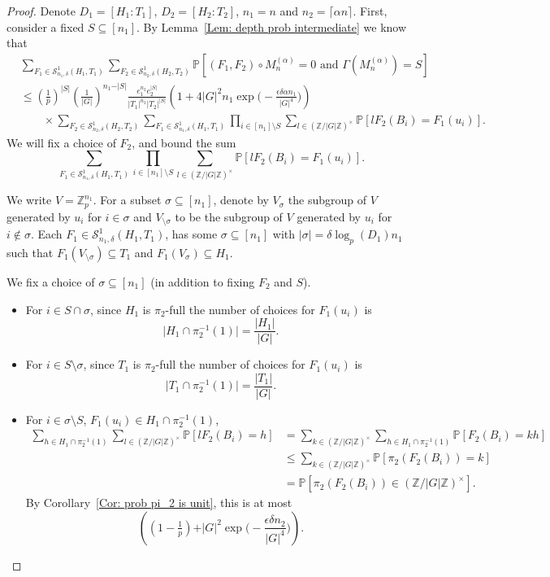 \documentclass[10pt,a4paper]{amsart}
\newcommand{\Mna}{M_{n}^{(\alpha)}}
\newcommand{\PPP}{\mathbb{P}}
\newcommand{\SSO}[3]{\mathcal{S}^1_{#1}(#2,#3)}
\newcommand{\Z}{\mathbb{Z}}
\newcommand{\ZG}{\Z/\abs{G}\Z}
\newcommand{\Zp}{\Z_p}
\newcommand{\abs}[1]{\vert#1\vert}
\newcommand{\ceil}[1]{\lceil#1\rceil}
\begin{document}
\begin{proof}
Denote $D_1=[H_1:T_1]$, $D_2=[H_2:T_2]$, $n_1=n$ and $n_2=\ceil{\alpha n}$.
First, consider a fixed $S\subseteq[n_1]$. 
By Lemma~\ref{Lem: depth prob intermediate} we know that
\begin{align*}
&\sum_{F_1\in \SSO{n_1,\delta}{H_1}{T_1}}
\sum_{F_2\in \SSO{n_2,\delta}{H_2}{T_2}}
\PPP[(F_1,F_2)\circ \Mna=0 \text{ and } \Gamma(\Mna)=S]\\
&\leq (\tfrac{1}{p})^{\abs{S}} (\tfrac{1}{\abs{G}})^{n_1-\abs{S}}
\frac{e_1^{n_2} e_2^{\abs{S}}}{\abs{T_1}^{n_2} \abs{T_2}^{\abs{S}}}
\left(1+4\abs{G}^2n_1 \exp\Big(-\frac{\epsilon \delta \alpha n_1}{|G|^4}\Big) \right)\\
&\quad\quad\times 
\sum_{F_2\in \SSO{n_2,\delta}{H_2}{T_2}}
\sum_{F_1\in \SSO{n_1,\delta}{H_1}{T_1}}
\prod_{i\in [n_1]\setminus S} \sum_{l\in (\Z/\abs{G}\Z)^{\times}} \PPP[l F_2(B_i)= F_1(u_i)].
\end{align*}
We will fix a choice of $F_2$, and bound the sum
\[
\sum_{F_1\in \SSO{n_1,\delta}{H_1}{T_1}}
\prod_{i\in [n_1]\setminus S} \sum_{l\in (\Z/\abs{G}\Z)^{\times}} \PPP[l F_2(B_i)= F_1(u_i)].
\]

We write $V=\Zp^{n_1}$.
For a subset $\sigma\subseteq[n_1]$, denote by $V_{\sigma}$ the subgroup of $V$ generated by $u_i$ for $i\in \sigma$ and $V_{\setminus \sigma}$ to be the subgroup of $V$ generated by $u_i$ for $i\notin \sigma$.
Each $F_1\in \SSO{n_1,\delta}{H_1}{T_1}$, has some $\sigma\subseteq[n_1]$ with $\abs{\sigma}= \delta\log_p(D_1) n_1$ such that $F_1(V_{\setminus \sigma})\subseteq T_1$ and $F_1(V_{\sigma})\subseteq H_1$.

We fix a choice of $\sigma\subseteq [n_1]$ (in addition to fixing $F_2$ and $S$).
\begin{itemize}
    \item For $i\in S\cap \sigma$, since $H_1$ is $\pi_2$-full the number of choices for $F_1(u_i)$ is
    \[
    \abs{H_1\cap \pi_2^{-1}(1)}
    =\frac{\abs{H_1}}{\abs{G}}.
    \]
    \item For $i\in S\setminus \sigma$, since $T_1$ is $\pi_2$-full the number of choices for $F_1(u_i)$ is
    \[
    \abs{T_1\cap \pi_2^{-1}(1)}
    =\frac{\abs{T_1}}{\abs{G}}.
    \]
    \item For $i\in \sigma\setminus S$, $F_1(u_i)\in H_1\cap \pi_2^{-1}(1)$, 
    \begin{align*}
    \sum_{h\in H_1\cap \pi_2^{-1}(1)}
    \sum_{l\in (\Z/\abs{G}\Z)^{\times}} \PPP[l F_2(B_i)= h]
    &=\sum_{k\in (\Z/\abs{G}\Z)^{\times}}
    \sum_{h\in H_1\cap \pi_2^{-1}(1)}
    \PPP[F_2(B_i)= kh]\\
    &\leq \sum_{k\in (\Z/\abs{G}\Z)^{\times}}
    \PPP[\pi_2(F_2(B_i))= k]\\
    &=\PPP[\pi_2(F_2(B_i))\in (\ZG)^{\times}].
    \end{align*}
    By Corollary~\ref{Cor: prob pi_2 is unit}, this is at most
    \[
     \left( (1-\tfrac{1}{p})
     +\abs{G}^2\exp\Big(-\frac{\epsilon\delta n_2}{|G|^4}\Big) \right).
    \]


\end{itemize}
\end{proof}
\end{document}
